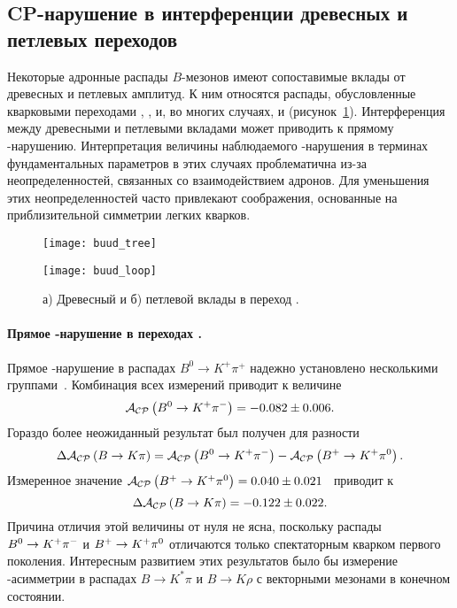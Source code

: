\subsection{CP-нарушение в интерференции древесных и петлевых переходов}\label{sec:cpv_tree_and_loop}
Некоторые адронные распады $B$-мезонов имеют сопоставимые вклады от древесных и петлевых амплитуд.  К ним относятся распады, обусловленные кварковыми переходами \btouud, \btouus, и, во многих случаях, \btodds и \btoddd (рисунок~\ref{fig:buud}).  Интерференция между древесными и петлевыми вкладами может приводить к прямому \cpconj-нарушению.  Интерпретация величины наблюдаемого \cpconj-нарушения в терминах фундаментальных параметров в этих случаях проблематична из-за неопределенностей, связанных со взаимодействием адронов.  Для уменьшения этих неопределенностей часто привлекают соображения, основанные на приблизительной симметрии легких кварков.

\begin{figure}[htb]
\begin{minipage}[b]{0.5\textwidth}
 \centering
  \texttt{[image: buud\_tree]}
 \subcaption{}
 \label{fig:buud_tree}
\end{minipage}
\begin{minipage}[b]{0.5\textwidth}
 \centering
  \texttt{[image: buud\_loop]}
 \subcaption{}
 \label{fig:buud_loop}
\end{minipage}
 \caption{а) Древесный и б) петлевой вклады в переход \btouud.}
 \label{fig:buud}
\end{figure}

\paragraph{\boldmath Прямое \cpconj-нарушение в переходах \btouuq. } Прямое \cpconj-нарушение в распадах $B^0\to K^+\pi^+$ надежно установлено несколькими группами~\cite{lhcb_btokpi_cpv,babar_btopipi,belle_btohh,cdf_btohh_cpv}.  Комбинация всех измерений приводит к величине~\cite{hfag}
\begin{equation}
 \mathcal{A}_\mathcal{CP}\left(B^0\to K^+\pi^-\right) = -0.082\pm0.006.
\end{equation}
Гораздо более неожиданный результат был получен для разности
\begin{equation}
 \Delta\mathcal{A}_\mathcal{CP}\left(B\to K\pi\right) = \mathcal{A}_\mathcal{CP}\left(B^0 \to K^+\pi^-\right) - \mathcal{A}_\mathcal{CP}\left(B^+ \to K^+\pi^0\right).
\end{equation}
Измеренное значение $\mathcal{A}_\mathcal{CP}\left(B^+ \to K^+\pi^0\right) = 0.040\pm0.021$~\cite{belle_btohh,babar_btohh} приводит к
\begin{equation}
 \Delta\mathcal{A}_\mathcal{CP}\left(B\to K\pi\right) = -0.122 \pm 0.022.
\end{equation}
Причина отличия этой величины от нуля не ясна, поскольку распады $B^0 \to K^+\pi^-$ и $B^+ \to K^+\pi^0$ отличаются только спектаторным кварком первого поколения.  Интересным развитием этих результатов было бы измерение \cpconj-асимметрии в распадах $B\to K^*\pi$ и $B\to K\rho$ с векторными мезонами в конечном состоянии.  

